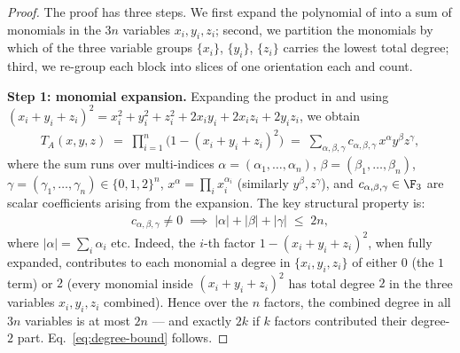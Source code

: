 \begin{proof}
The proof has three steps. We first expand the polynomial of  into a sum of monomials in the $3n$ variables $x_i, y_i, z_i$; second, we partition the monomials by which of the three variable groups $\{x_i\}$, $\{y_i\}$, $\{z_i\}$ carries the lowest total degree; third, we re-group each block into slices of one orientation each and count.

\textbf{Step 1: monomial expansion.} Expanding the product in  and using $(x_i + y_i + z_i)^2 = x_i^2 + y_i^2 + z_i^2 + 2 x_i y_i + 2 x_i z_i + 2 y_i z_i$, we obtain
\begin{align*}
T_A(x, y, z) \;=\; \prod_{i=1}^n \big( 1 - (x_i + y_i + z_i)^2 \big) \;=\; \sum_{\alpha, \beta, \gamma} c_{\alpha, \beta, \gamma} \, x^{\alpha} y^{\beta} z^{\gamma},
\end{align*}
where the sum runs over multi-indices $\alpha = (\alpha_1, \dots, \alpha_n)$, $\beta = (\beta_1, \dots, \beta_n)$, $\gamma = (\gamma_1, \dots, \gamma_n) \in \{0, 1, 2\}^n$, $x^{\alpha} = \prod_i x_i^{\alpha_i}$ (similarly $y^{\beta}, z^{\gamma}$), and $c_{\alpha, \beta, \gamma} \in \F_3$ are scalar coefficients arising from the expansion. The key structural property is:
\begin{align}\label{eq:degree-bound}
c_{\alpha, \beta, \gamma} \ne 0 \;\implies\; |\alpha| + |\beta| + |\gamma| \;\le\; 2n,
\end{align}
where $|\alpha| = \sum_i \alpha_i$ etc. Indeed, the $i$-th factor $1 - (x_i + y_i + z_i)^2$, when fully expanded, contributes to each monomial a degree in $\{x_i, y_i, z_i\}$ of either $0$ (the $1$ term) or $2$ (every monomial inside $(x_i + y_i + z_i)^2$ has total degree $2$ in the three variables $x_i, y_i, z_i$ combined). Hence over the $n$ factors, the combined degree in all $3n$ variables is at most $2n$ — and exactly $2k$ if $k$ factors contributed their degree-$2$ part. Eq.~\eqref{eq:degree-bound} follows.


\end{proof}
